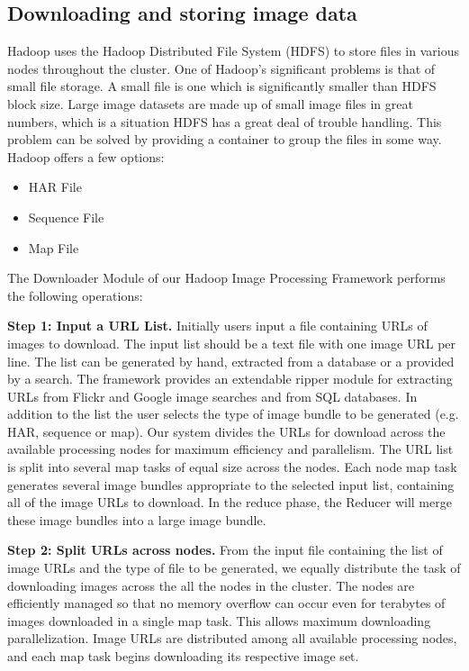 \documentclass[conference]{IEEEtran}
\begin{document}
\subsection{Downloading and storing image data}
Hadoop uses the Hadoop Distributed File System (HDFS)\cite{Shvachko2010} to store files
in various nodes throughout the cluster.  One of Hadoop's significant
problems is that of small file storage. \cite{White2009} A small file
is one which is significantly smaller than HDFS block size.  Large
image datasets are made up of small image files in great numbers,
which is a situation HDFS has a great deal of trouble
handling. This problem can be solved by providing a container to group
the files in some way. Hadoop offers a few options:
\begin{itemize}
	\item HAR File
	\item Sequence File
	\item Map File
\end{itemize}

The Downloader Module of our Hadoop Image Processing Framework
performs the following operations:

\textbf{Step 1: Input a URL List.} Initially users input a file
containing URLs of images to download. The input list should be a text
file with one image URL per line. The list can be generated by hand,
extracted from a database or a provided by a search. The framework
provides an extendable ripper module for extracting URLs from Flickr
and Google image searches and from SQL databases. In addition to the
list the user selects the type of image bundle to be generated
(e.g. HAR, sequence or map).  Our system divides the URLs for download
across the available processing nodes for maximum efficiency and
parallelism. The URL list is split into several map tasks of equal size across the nodes. Each node map task generates several image bundles
appropriate to the selected input list, containing all of the image URLs
to download. In the reduce phase, the Reducer will merge these image
bundles into a large image bundle.

\textbf{Step 2: Split URLs across nodes.}  From the input file
containing the list of image URLs and the type of file to be
generated, we equally distribute the task of downloading images across
the all the nodes in the cluster. The nodes are efficiently managed so
that no memory overflow can occur even for terabytes of images
downloaded in a single map task. This allows maximum downloading
parallelization. Image URLs are distributed among all available
processing nodes, and each map task begins downloading its respective
image set.
\end{document}
